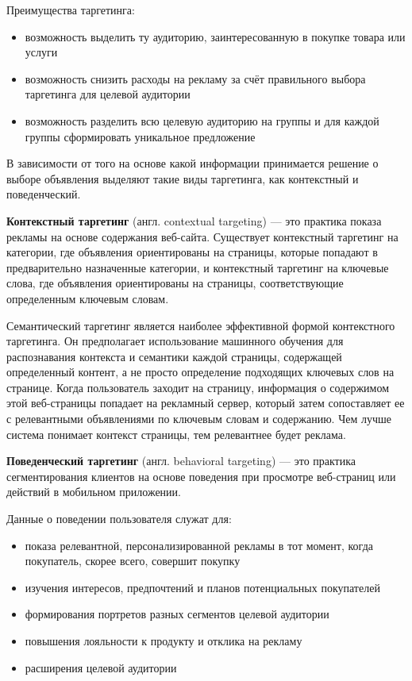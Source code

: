 \documentclass[times]{itmo-student-thesis}
\begin{document}
Преимущества таргетинга:
\begin{itemize}
\item возможность выделить ту аудиторию, заинтересованную в покупке товара или услуги
\item возможность снизить расходы на рекламу за счёт правильного выбора таргетинга для целевой аудитории
\item возможность разделить всю целевую аудиторию  на группы и для каждой группы сформировать уникальное предложение
\end{itemize}

В зависимости от того на основе какой информации принимается решение о выборе объявления выделяют такие виды таргетинга, как контекстный и поведенческий.

\textbf{Контекстный таргетинг} (англ. contextual targeting)\cite{contextual-targeting} — это практика показа рекламы на основе содержания веб-сайта. Существует контекстный таргетинг на категории, где объявления ориентированы на страницы, которые попадают в предварительно назначенные категории, и контекстный таргетинг на ключевые слова, где объявления ориентированы на страницы, соответствующие определенным ключевым словам. 

Семантический таргетинг является наиболее эффективной формой контекстного таргетинга. Он предполагает использование машинного обучения для распознавания контекста и семантики каждой страницы, содержащей определенный контент, а не просто определение подходящих ключевых слов на странице. Когда пользователь заходит на страницу, информация о содержимом этой веб-страницы попадает на рекламный сервер, который затем сопоставляет ее с релевантными объявлениями по ключевым словам и содержанию. Чем лучше система понимает контекст страницы, тем релевантнее будет реклама.

\textbf{Поведенческий таргетинг} (англ. behavioral targeting)\label{behavioral-targeting} — это практика сегментирования клиентов на основе поведения при просмотре веб-страниц или действий в мобильном приложении. 

Данные о поведении пользователя служат для:
\begin{itemize}
\item показа релевантной, персонализированной рекламы в тот момент, когда покупатель, скорее всего, совершит покупку
\item изучения интересов, предпочтений и планов потенциальных покупателей
\item формирования портретов разных сегментов целевой аудитории
\item повышения лояльности к продукту и отклика на рекламу
\item расширения целевой аудитории
\end{itemize}
\end{document}
